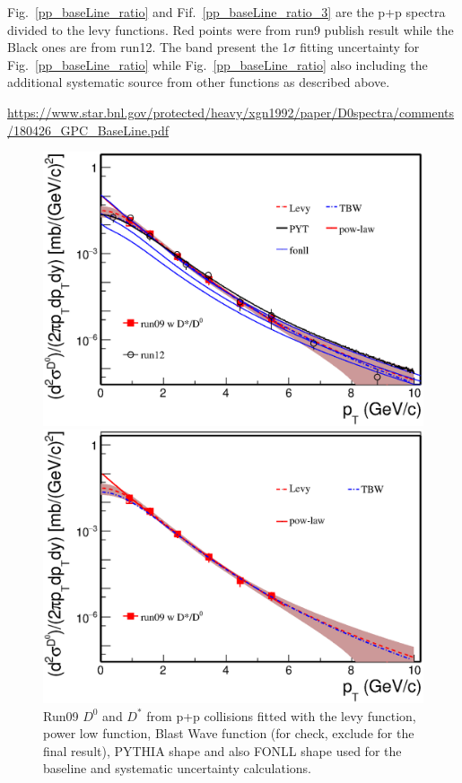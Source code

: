 Fig.~\ref{pp_baseLine_ratio} and Fif.~\ref{pp_baseLine_ratio_3} are the p+p spectra divided to the levy functions. Red points were from run9 publish result while the Black ones are from run12. The band present the 1$\sigma$ fitting uncertainty for Fig.~\ref{pp_baseLine_ratio} while Fig.~\ref{pp_baseLine_ratio} also including the additional systematic source from other functions as described above.


\url{https://www.star.bnl.gov/protected/heavy/xgn1992/paper/D0spectra/comments/180426_GPC_BaseLine.pdf}

\begin{figure}[htbp]
\begin{minipage}[htbp]{0.47\linewidth}
\centering
\includegraphics[width=1.0\textwidth,angle=0]{figure/Run14_D0HFT/pp_baseLine1.eps}
\caption{Run09 $D^{0}$ and $D^*$ from p+p collisions fitted with the levy function, power low function, Blast Wave function (for check, exclude for the final result), PYTHIA shape and also FONLL shape used for the baseline and systematic uncertainty calculations. \label{pp_baseLine1}}
\end{minipage}
\hfill
\begin{minipage}[htbp]{0.47\linewidth}
\centering
\includegraphics[width=1.0\textwidth,angle=0]{figure/Run14_D0HFT/pp_baseLine2.eps}

\end{minipage}
\end{figure}
